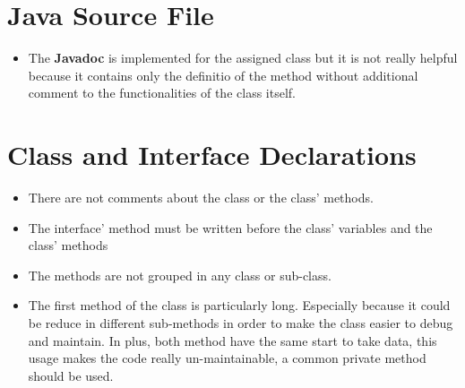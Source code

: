 \section{Java Source File}
\begin{itemize}
    \begin{itemize}
      \item The \textbf{Javadoc} is implemented for the assigned class but it is not really helpful because
        it contains only the definitio of the method without additional comment to the functionalities of the class itself.
    \end{itemize}
\end{itemize}
\section{Class and Interface Declarations}
\begin{itemize}
    \begin{itemize}
      \item There are not comments about the class or the class' methods.
    \end{itemize}
    \begin{itemize}
      \item The interface' method
      must be written before the class' variables and the class' methods
    \end{itemize}
    \begin{itemize}
      \item The methods are not grouped in any class or sub-class.
    \end{itemize}
    \begin{itemize}
      \item The first method of the class
        is particularly long. Especially because it could be reduce in different sub-methods in order to make the class
        easier to debug and maintain. In plus, both method have the same start to take data, this usage makes the code
        really un-maintainable, a common private method should be used.
    \end{itemize}
\end{itemize}
